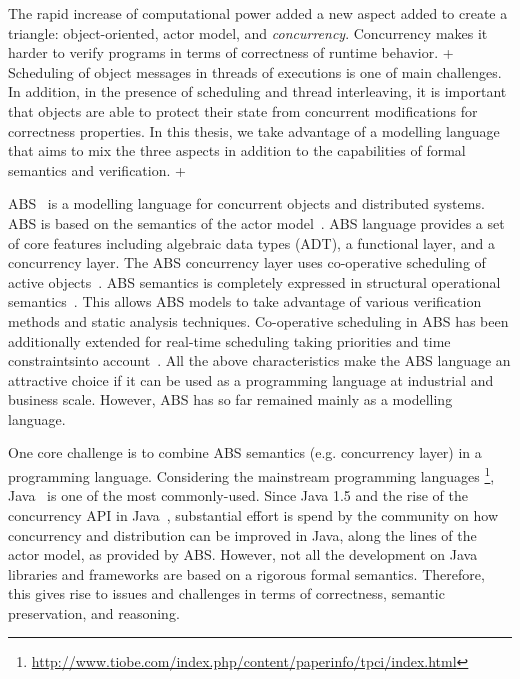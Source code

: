 The rapid increase of computational power added a new aspect added to create a triangle: object-oriented, actor model, and \emph{concurrency}.
Concurrency makes it harder to verify programs in terms of correctness of runtime behavior. 
+
Scheduling of object messages in threads of executions is one of main challenges.
In addition, in the presence of scheduling and thread interleaving, it is important that objects are able to protect their state from concurrent modifications for correctness properties.
In this thesis, we take advantage of a modelling language that aims to mix the three aspects in addition to the capabilities of formal semantics and verification.
+

ABS~\cite{johnsen2012abs,hahnlehjlssw11} is a modelling language for concurrent objects and distributed systems.
ABS is based on the semantics of the actor model~\cite{actors:agha}.
ABS language provides a set of core features including algebraic data types (ADT), a functional layer, and a concurrency layer.
The ABS concurrency layer uses co-operative scheduling of active objects~\cite{creol:broch:owe}.
ABS semantics is completely expressed in structural operational semantics~\cite{plotkin:sos}.
This allows ABS models to take advantage of various verification methods and static analysis techniques.
% 
Co-operative scheduling in ABS has been additionally extended for real-time scheduling taking priorities and time constraintsinto account~\cite{bjork2013:rtabs,johnsen2012modeling}.
All the above characteristics make the ABS language an attractive choice if it
can be used as a programming language at industrial and business scale.
However, ABS has so far remained mainly as a modelling language.

One core challenge is to combine ABS semantics (e.g. concurrency layer) in a
programming language.
Considering the mainstream programming languages
\footnote{\url{http://www.tiobe.com/index.php/content/paperinfo/tpci/index.html}}, Java~\cite{gosling2000java} is one of the most commonly-used.
Since Java 1.5 and the rise of the concurrency API in Java~\cite{jsr166}, substantial effort is spend by the community on how concurrency and distribution can be improved in Java, along the lines of the actor model, as provided by ABS.
However, not all the development on Java libraries and frameworks are based on a rigorous formal semantics. 
Therefore, this gives rise to issues and challenges in terms of correctness, semantic preservation, and reasoning.

